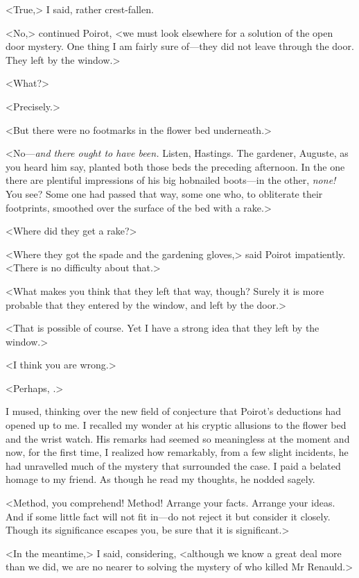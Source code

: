  <True,> I said, rather crest-fallen. 

 <No,> continued Poirot, <we must look elsewhere for a solution of the open door mystery. One thing I am fairly sure of—they did not leave through the door. They left by the window.> 

 <What?> 

 <Precisely.> 

 <But there were no footmarks in the flower bed underneath.> 

 <No—\emph{and there ought to have been.} Listen, Hastings. The gardener, Auguste, as you heard him say, planted both those beds the preceding afternoon. In the one there are plentiful impressions of his big hobnailed boots—in the other, \emph{none!} You see? Some one had passed that way, some one who, to obliterate their footprints, smoothed over the surface of the bed with a rake.> 

 <Where did they get a rake?> 

 <Where they got the spade and the gardening gloves,> said Poirot impatiently. <There is no difficulty about that.> 

 <What makes you think that they left that way, though? Surely it is more probable that they entered by the window, and left by the door.> 

 <That is possible of course. Yet I have a strong idea that they left by the window.> 

 <I think you are wrong.> 

 <Perhaps, .> 

 I mused, thinking over the new field of conjecture that Poirot's deductions had opened up to me. I recalled my wonder at his cryptic allusions to the flower bed and the wrist watch. His remarks had seemed so meaningless at the moment and now, for the first time, I realized how remarkably, from a few slight incidents, he had unravelled much of the mystery that surrounded the case. I paid a belated homage to my friend. As though he read my thoughts, he nodded sagely. 

 <Method, you comprehend! Method! Arrange your facts. Arrange your ideas. And if some little fact will not fit in—do not reject it but consider it closely. Though its significance escapes you, be sure that it is significant.> 

 <In the meantime,> I said, considering, <although we know a great deal more than we did, we are no nearer to solving the mystery of who killed Mr Renauld.> 


